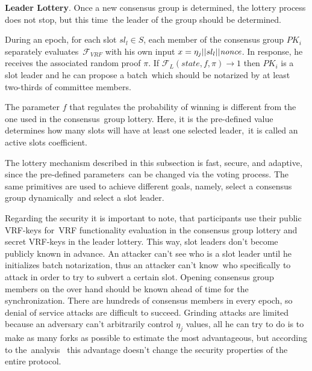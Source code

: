 \textbf{Leader Lottery}.
Once a new consensus group is determined, the lottery process does not stop, but this time\
the leader of the group should be determined.

During an epoch, for each slot ${sl_l \in S}$, each member of the consensus group $PK_i$ separately evaluates\
${\mathcal{F}}_{VRF}$ with his own input ${x = \eta_j || sl_l || \emph{nonce}}$.
In response, he receives the associated random proof $\pi$.
If ${\mathcal{F}}_{L}(state, f, \pi) \rightarrow 1$ then $PK_i$ is a slot leader and he can propose a batch\
which should be notarized by at least two-thirds of committee members.

The parameter $f$ that regulates the probability of winning is different from the one used in the consensus\
group lottery.
Here, it is the pre-defined value determines how many slots will have at least one selected leader,\
it is called an active slots coefficient.

The lottery mechanism described in this subsection is fast, secure, and adaptive, since the pre-defined parameters\
can be changed via the voting process.
The same primitives are used to achieve different goals, namely, select a consensus group dynamically\
and select a slot leader.

Regarding the security it is important to note, that participants use their public VRF-keys for\
VRF functionality evaluation in the consensus group lottery and secret VRF-keys in the leader lottery.
This way, slot leaders don't become publicly known in advance.
An attacker can't see who is a slot leader until he initializes batch notarization, thus an attacker can't know\
who specifically to attack in order to try to subvert a certain slot.
Opening consensus group members on the over hand should be known ahead of time for the synchronization.
There are hundreds of consensus members in every epoch, so denial of service attacks are difficult to succeed.
Grinding attacks are limited because an adversary can't arbitrarily control $\eta_j$ values,
all he can try to do is to make as many forks as possible to estimate the most advantageous, but according to the\
analysis~\cite{cryptoeprint:2017/573} this advantage doesn't change the security properties of the entire protocol.

